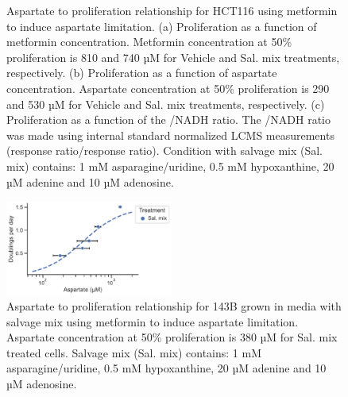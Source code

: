 \begin{figure}[ht]
\begin{subfigure}[b]{0.49\textwidth}
         \caption{}
         \label{fig:app_ch2:HCT116_Met_NAD_vs_prlfr}
     \end{subfigure}
        \caption[HCT116 metformin titration aspartate to proliferation.]{
        Aspartate to proliferation relationship for HCT116 using metformin to induce aspartate limitation.
        (a) Proliferation as a function of metformin concentration.
        Metformin concentration at 50\% proliferation is 810 and 740 µM for Vehicle and Sal. mix treatments, respectively.
        (b) Proliferation as a function of aspartate concentration.
        Aspartate concentration at 50\% proliferation is 290 and 530 µM for Vehicle and Sal. mix treatments, respectively.
        (c) Proliferation as a function of the \NAD{}/NADH ratio.
        The \NAD{}/NADH ratio was made using internal standard normalized LCMS measurements (response ratio/response ratio).
        Condition with salvage mix (Sal. mix) contains: 1 mM asparagine/uridine, 0.5 mM hypoxanthine, 20 µM adenine and 10 µM adenosine.
        }
        \label{fig:app_ch2:HCT116_asp_prlfr_met}
\end{figure}

\begin{figure}[ht]
    \centering
    \includegraphics[width=0.49\textwidth]{figures/chap2/app/143B_Met_Asp_vs_prlfr.pdf}
    \caption[143B metformin titration aspartate to proliferation.]{
    Aspartate to proliferation relationship for 143B grown in media with salvage mix using metformin to induce aspartate limitation.
    Aspartate concentration at 50\% proliferation is 380 µM for Sal. mix treated cells.
    Salvage mix (Sal. mix) contains: 1 mM asparagine/uridine, 0.5 mM hypoxanthine, 20 µM adenine and 10 µM adenosine.
    }
    \label{fig:app_ch2:143B_Met_Asp_vs_prlfr}
\end{figure}




